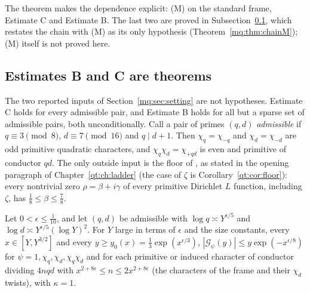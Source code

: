 The theorem makes the dependence explicit: (M) on the standard frame, Estimate C and Estimate B. The last two are proved in Subsection~\ref{mq:sub:BC}, which restates the chain with (M) as its only hypothesis (Theorem~\ref{mq:thm:chainM}); (M) itself is not proved here.

\subsection{Estimates B and C are theorems}\label{mq:sub:BC}
The two reported inputs of Section~\ref{mq:sec:setting} are not hypotheses. Estimate C holds for every admissible pair, and Estimate B holds for all but a sparse set of admissible pairs, both unconditionally. Call a pair of primes $(q,d)$ \emph{admissible} if $q\equiv3\pmod8$, $d\equiv7\pmod{16}$ and $q\mid d+1$. Then $\chi_q=\chi_{-q}$ and $\chi_d=\chi_{-d}$ are odd primitive quadratic characters, and $\chi_q\chi_d=\chi_{+qd}$ is even and primitive of conductor $qd$. The only outside input is the floor of \cite{OAI26a}, as stated in the opening paragraph of Chapter~\ref{qt:ch:ladder} (the case of $\zeta$ is Corollary~\ref{qt:cor:floor}): every nontrivial zero $\rho=\beta+i\gamma$ of every primitive Dirichlet $L$ function, including $\zeta$, has $\frac18\le\beta\le\frac78$.

\begin{theorem}[Estimate C]\label{mq:thm:estC}
Let $0<\epsilon\le\frac1{10}$, and let $(q,d)$ be admissible with $\log q\asymp Y^{\epsilon/5}$ and $\log d\asymp Y^{\epsilon/5}(\log Y)^2$. For $Y$ large in terms of $\epsilon$ and the size constants, every $x\in[Y,Y^{3/2}]$ and every $y\ge y_0(x)=\frac13\exp(x^{\epsilon/3})$, $|\mathcal G_\psi(y)|\le y\exp(-x^{\epsilon/8})$ for $\psi=1,\chi_q,\chi_d,\chi_q\chi_d$ and for each primitive or induced character of conductor dividing $4nqd$ with $x^{2+8\epsilon}\le n\le2x^{2+8\epsilon}$ (the characters of the frame and their $\chi_d$ twists), with $\kappa=1$.
\end{theorem}


